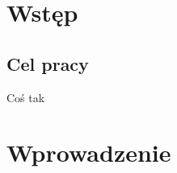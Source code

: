 \documentclass[a4paper,12pt]{article}
\begin{document}



\tableofcontents
\newpage





\section{Wstęp}

\subsection{Cel pracy}
Coś tak\cite{Chen2012a}


\section{Wprowadzenie}
\newpage





\listoffigures
\newpage

\printbibliography
\end{document}

